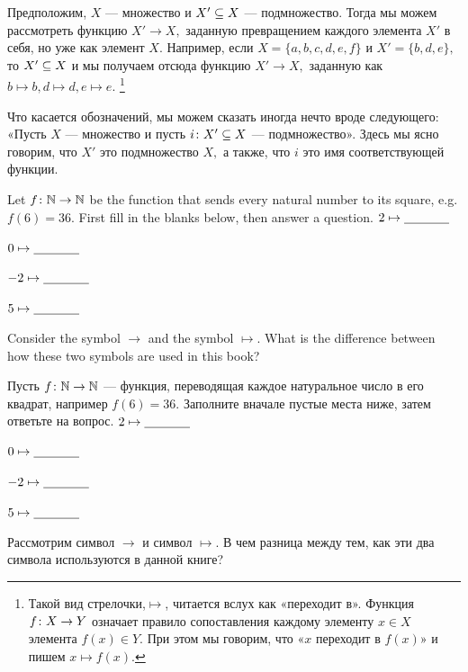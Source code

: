 \documentclass[CT4S-EN-RU]{subfiles}
\begin{document}
\begin{exampleRUS}\label{ex:subset as function}
Предположим, $X$ — множество и $X'\ss X$ — подмножество. Тогда мы можем рассмотреть функцию $X'\to X,$ заданную превращением каждого элемента $X'$ в себя, но уже как элемент $X.$ Например, если $X=\{a,b,c,d,e,f\}$ и $X'=\{b,d,e\},$ то $X'\ss X$ и мы получаем отсюда функцию $X'\to X,$ заданную как $b\mapsto b, d\mapsto d, e\mapsto e.$%
\footnote{Такой вид стрелочки,\;\;$\mapsto$\;\;, читается вслух как «переходит в». Функция $f\taking X\to Y$ означает правило сопоставления каждому элементу $x\in X$ элемента $f(x)\in Y.$ При этом мы говорим, что «$x$ переходит в $f(x)$» и пишем $x\mapsto f(x).$}

Что касается обозначений, мы можем сказать иногда нечто вроде следующего: «Пусть $X$ — множество и пусть $i\taking X'\ss X$ — подмножество». Здесь мы ясно говорим, что $X'$ это подмножество $X,$ а также, что $i$ это имя соответствующей функции.
\end{exampleRUS}

\begin{exerciseENG}
Let $f\taking\NN\to\NN$ be the function that sends every natural number to its square, e.g. $f(6)=36.$ First fill in the blanks below, then answer a question.
\sexc $2\mapsto\ul{\hspace{.5in}}$
\item $0\mapsto\ul{\hspace{.5in}}$
\item $-2\mapsto\ul{\hspace{.5in}}$
\item $5\mapsto\ul{\hspace{.5in}}$
\item Consider the symbol $\to$ and the symbol $\mapsto.$ What is the difference between how these two symbols are used in this book?
\endsexc
\end{exerciseENG}

\begin{exerciseRUS}
Пусть $f\taking\NN\to\NN$ — функция, переводящая каждое натуральное число в его квадрат, например $f(6)=36.$ Заполните вначале пустые места ниже, затем ответьте на вопрос.
\sexc $2\mapsto\ul{\hspace{.5in}}$
\item $0\mapsto\ul{\hspace{.5in}}$
\item $-2\mapsto\ul{\hspace{.5in}}$
\item $5\mapsto\ul{\hspace{.5in}}$
\item Рассмотрим символ $\to$ и символ $\mapsto.$ В чем разница между тем, как эти два символа используются в данной книге?
\endsexc
\end{exerciseRUS}
\end{document}
